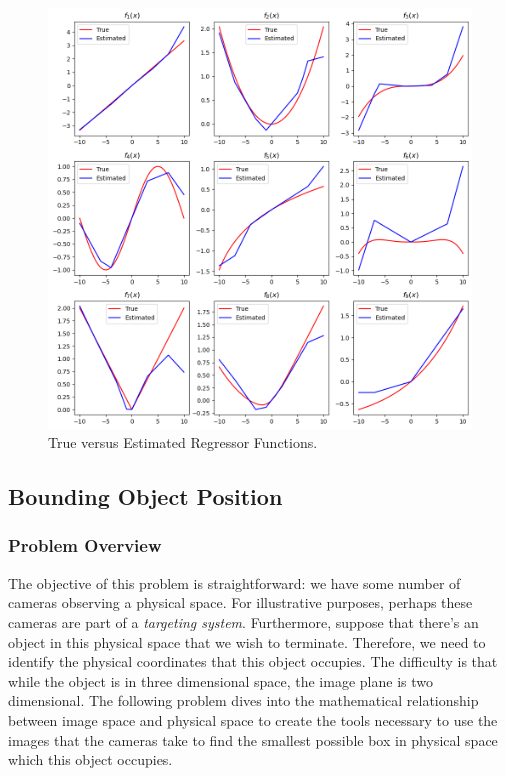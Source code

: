 \documentclass[12pt,reqno]{article}
\theoremstyle{definition}
\numberwithin{equation}{section}
\begin{document}
\begin{figure}[htbp]
    \centering
    \includegraphics[width=\linewidth]{../examples/364a/cvx-ch7/gen_add_regr_fit.png}
    \caption{True versus Estimated Regressor Functions.}
    \label{fig:gen_add_fit}
\end{figure}

\newpage

\subsection{Bounding Object Position}

\subsubsection*{Problem Overview}
The objective of this problem is straightforward: we have some number of cameras observing
a physical space. For illustrative purposes, perhaps these cameras are part of a \textit{targeting system}.
Furthermore, suppose that there's an object in this physical space that we wish to terminate. Therefore,
we need to identify the physical coordinates that this object occupies. The difficulty is that while the object
is in three dimensional space, the image plane is two dimensional. The following
problem dives into the mathematical relationship between image space and physical space to create the tools
necessary to use the images that the cameras take to find the smallest possible box in physical space which this object occupies.
\end{document}
